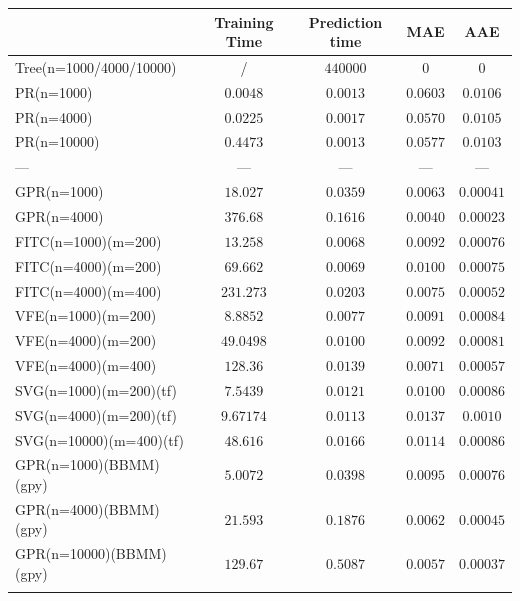 \documentclass[12pt,a4paper,oneside]{book}
\begin{document}
\begin{table}\centering 
\begin{tabular}[t]{lcccc}\toprule
            &   Training Time  &  Prediction time &  MAE & AAE   \\ \midrule
Tree(n=1000/4000/10000)    &/ & $440 000$ &  $0$  &   $0$   \\\addlinespace
PR(n=1000) & $0.0048$ & $0.0013$ & $0.0603$   & $0.0106$      \\\addlinespace
PR(n=4000)    & $0.0225$ & $0.0017$   & $0.0570$ & $0.0105$   \\\addlinespace
PR(n=10000)	   & $0.4473$  & $0.0013$   & $0.0577$ & $0.0103$     \\\addlinespace
\qquad \qquad \qquad \qquad \qquad ---	  &   --- & --- & --- & ---     \\\addlinespace
GPR(n=1000) & $18.027$  & $0.0359$ & $0.0063$  & $0.00041$      \\\addlinespace
GPR(n=4000)   & $376.68$ &  $0.1616$  & $0.0040$ & $0.00023$     \\\addlinespace
FITC(n=1000)(m=200)   & $13.258$ & $0.0068$   & $0.0092$  & $0.00076$ \\\addlinespace
FITC(n=4000)(m=200)    & $69.662$ & $0.0069$    & $0.0100$ & $0.00075$    \\\addlinespace
FITC(n=4000)(m=400)	  & $231.273$ & $0.0203$   & $0.0075$ & $0.00052$    \\\addlinespace
VFE(n=1000)(m=200)   & $8.8852$  & $0.0077$    & $0.0091$  & $0.00084$ \\\addlinespace
VFE(n=4000)(m=200)  & $49.0498$  & $0.0100$   & $0.0092$ & $0.00081$ \\\addlinespace
VFE(n=4000)(m=400)	  & $128.36$ & $0.0139$   & $0.0071$  & $0.00057$ \\\addlinespace
SVG(n=1000)(m=200)(tf)    & $7.5439$ & $0.0121$   & $0.0100$ & $0.00086$ \\\addlinespace
SVG(n=4000)(m=200)(tf)   & $9.67174$ & $0.0113$   & $0.0137$ & $0.0010$  \\\addlinespace
SVG(n=10000)(m=400)(tf)	  & $48.616$  &  $0.0166$  & $0.0114$  & $0.00086$  \\\addlinespace
GPR(n=1000)(BBMM)(gpy)   & $5.0072$ & $0.0398$   & $0.0095$ & $0.00076$      \\\addlinespace
GPR(n=4000)(BBMM)(gpy)   & $21.593$ &  $0.1876$  & $0.0062$  & $0.00045$ \\\addlinespace
GPR(n=10000)(BBMM)(gpy)   & $129.67$ & $0.5087$   & $0.0057$  & $0.00037$ \\\addlinespace

\end{tabular}
\end{table}
\end{document}

